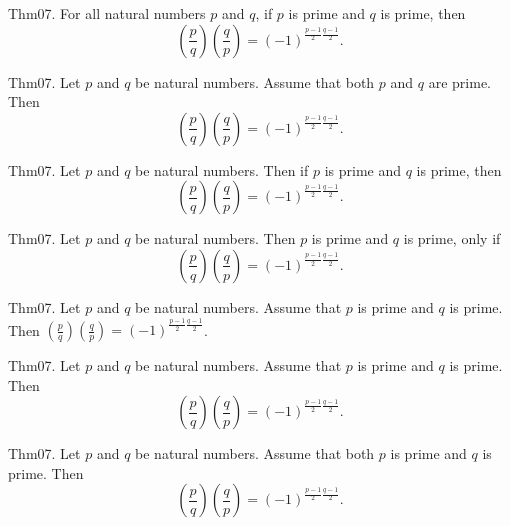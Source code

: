 \documentclass{article}
\begin{document}
Thm07. For all natural numbers $p$ and $q$, if $p$ is prime and $q$ is prime, then $$\left(\frac{ p }{ q }\right) \left(\frac{ q }{ p }\right) = (- 1)^ {\frac{ p - 1}{2}\frac{ q - 1}{2}}.$$

Thm07. Let $p$ and $q$ be natural numbers. Assume that both $p$ and $q$ are prime. Then $$\left(\frac{ p }{ q }\right) \left(\frac{ q }{ p }\right) = (- 1)^ {\frac{ p - 1}{2}\frac{ q - 1}{2}}.$$

Thm07. Let $p$ and $q$ be natural numbers. Then if $p$ is prime and $q$ is prime, then $$\left(\frac{ p }{ q }\right) \left(\frac{ q }{ p }\right) = (- 1)^ {\frac{ p - 1}{2}\frac{ q - 1}{2}}.$$

Thm07. Let $p$ and $q$ be natural numbers. Then $p$ is prime and $q$ is prime, only if $$\left(\frac{ p }{ q }\right) \left(\frac{ q }{ p }\right) = (- 1)^ {\frac{ p - 1}{2}\frac{ q - 1}{2}}.$$

Thm07. Let $p$ and $q$ be natural numbers. Assume that $p$ is prime and $q$ is prime. Then $\left(\frac{ p }{ q }\right) \left(\frac{ q }{ p }\right) = (- 1)^ {\frac{ p - 1}{2}\frac{ q - 1}{2}}$.

Thm07. Let $p$ and $q$ be natural numbers. Assume that $p$ is prime and $q$ is prime. Then $$\left(\frac{ p }{ q }\right) \left(\frac{ q }{ p }\right) = (- 1)^ {\frac{ p - 1}{2}\frac{ q - 1}{2}}.$$

Thm07. Let $p$ and $q$ be natural numbers. Assume that both $p$ is prime and $q$ is prime. Then $$\left(\frac{ p }{ q }\right) \left(\frac{ q }{ p }\right) = (- 1)^ {\frac{ p - 1}{2}\frac{ q - 1}{2}}.$$
\end{document}
